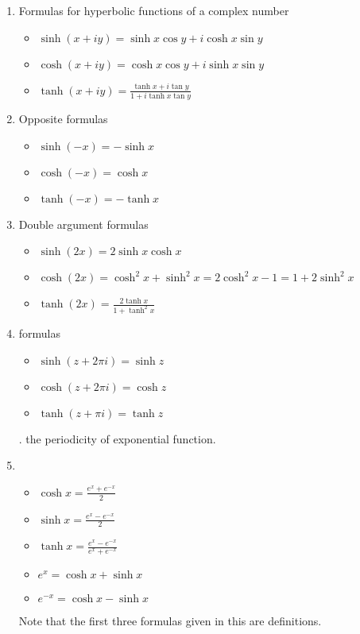 \documentclass[12pt]{article}
\newcommand{\ds}{\displaystyle}
\begin{document}
\begin{enumerate}
\item Formulas for hyperbolic functions of a complex number

\begin{itemize}
\item $\sinh(x+iy)=\sinh x\cos y+i\cosh x\sin y$
\item $\cosh(x+iy)=\cosh x\cos y+i\sinh x\sin y$
\item $\ds \tanh(x+iy)=\frac{\tanh x+i\tan y}{1+i\tanh x\tan y}$
\end{itemize}

\item Opposite formulas

\begin{itemize}
\item $\sinh(-x)=-\sinh x$
\item $\cosh(-x)=\cosh x$
\item $\tanh(-x)=-\tanh x$
\end{itemize}

\item Double argument formulas

\begin{itemize}
\item $\sinh(2x)=2\sinh x\cosh x$
\item $\cosh(2x)=\cosh^2 x+\sinh^2 x=2\cosh^2 x-1=1+2\sinh^2 x$
\item $\ds \tanh(2x)=\frac{2\tanh x}{1+\tanh^2 x}$
\end{itemize}

\item {} formulas

\begin{itemize}
\item $\sinh(z+2\pi i) = \sinh{z}$
\item $\cosh(z+2\pi i) = \cosh{z}$
\item $\tanh(z+\pi i) = \tanh{z}$
\end{itemize}

. the periodicity of exponential function.

\item {}

\begin{itemize}
\item $\ds \cosh x=\frac{e^x+e^{-x}}{2}$
\item $\ds \sinh x=\frac{e^x-e^{-x}}{2}$
\item $\ds \tanh x=\frac{e^x-e^{-x}}{e^x+e^{-x}}$
\item $e^x=\cosh x+\sinh x$
\item $e^{-x}=\cosh x-\sinh x$
\end{itemize}

Note that the first three formulas given in this  are definitions.

\end{enumerate}
\end{document}
